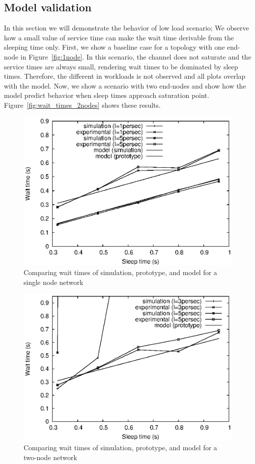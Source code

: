 \subsection{Model validation}
In this section we will demonstrate the behavior of low load scenario; We observe how a small value of service time can make the wait time derivable from the sleeping time only. First, we show a baseline case for a topology with one end-node in Figure~\ref{fig:1node}. In this scenario, the channel does not saturate and the service times are always small, rendering wait times to be dominated by sleep times. Therefore, the different in workloads is not observed and all plots overlap with the model. Now, we show a scenario with two end-nodes and show how the model predict behavior when sleep times approach saturation point. Figure~\ref{fig:wait_times_2nodes} shows these results.

\begin{figure}[t]
\centering
\includegraphics[scale=0.65]{figures/1node_both.eps}
\caption{Comparing wait times of simulation, prototype, and model for a single node network}
\label{fig:1node_both}
\end{figure}

\begin{figure}[t]
\centering
\includegraphics[scale=0.65]{figures/2node_both.eps}
\caption{Comparing wait times of simulation, prototype, and model for a two-node network}
\label{fig:2node_both}
\end{figure}



